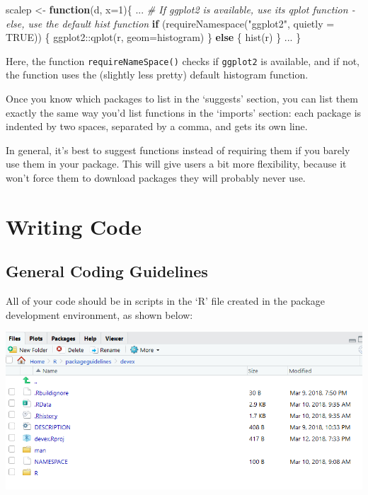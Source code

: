\documentclass[
]{book}
\newenvironment{Shaded}{\begin{snugshade}}{\end{snugshade}}
\newcommand{\AttributeTok}[1]{\textcolor[rgb]{0.77,0.63,0.00}{#1}}
\newcommand{\CommentTok}[1]{\textcolor[rgb]{0.56,0.35,0.01}{\textit{#1}}}
\newcommand{\ConstantTok}[1]{\textcolor[rgb]{0.00,0.00,0.00}{#1}}
\newcommand{\ControlFlowTok}[1]{\textcolor[rgb]{0.13,0.29,0.53}{\textbf{#1}}}
\newcommand{\DecValTok}[1]{\textcolor[rgb]{0.00,0.00,0.81}{#1}}
\newcommand{\FunctionTok}[1]{\textcolor[rgb]{0.00,0.00,0.00}{#1}}
\newcommand{\NormalTok}[1]{#1}
\newcommand{\OtherTok}[1]{\textcolor[rgb]{0.56,0.35,0.01}{#1}}
\newcommand{\SpecialCharTok}[1]{\textcolor[rgb]{0.00,0.00,0.00}{#1}}
\newcommand{\StringTok}[1]{\textcolor[rgb]{0.31,0.60,0.02}{#1}}
\begin{document}
\begin{Shaded}
\begin{Highlighting}[]
\NormalTok{scalep }\OtherTok{\textless{}{-}} \ControlFlowTok{function}\NormalTok{(d, }\AttributeTok{x=}\DecValTok{1}\NormalTok{)\{}
\NormalTok{  ...}
  \CommentTok{\# If ggplot2 is available, use its qplot function {-} else, use the default hist function}
  \ControlFlowTok{if}\NormalTok{ (}\FunctionTok{requireNamespace}\NormalTok{(}\StringTok{"ggplot2"}\NormalTok{, }\AttributeTok{quietly =} \ConstantTok{TRUE}\NormalTok{)) \{}
\NormalTok{    ggplot2}\SpecialCharTok{::}\FunctionTok{qplot}\NormalTok{(r, }\AttributeTok{geom=}\StringTok{\textquotesingle{}histogram\textquotesingle{}}\NormalTok{)}
\NormalTok{  \} }\ControlFlowTok{else}\NormalTok{ \{}
    \FunctionTok{hist}\NormalTok{(r)}
\NormalTok{  \}}
\NormalTok{  ...}
\NormalTok{\}}
\end{Highlighting}
\end{Shaded}

Here, the function \texttt{requireNameSpace()} checks if \texttt{ggplot2} is available, and if not, the function uses the (slightly less pretty) default histogram function.

Once you know which packages to list in the `suggests' section, you can list them exactly the same way you'd list functions in the `imports' section: each package is indented by two spaces, separated by a comma, and gets its own line.

In general, it's best to suggest functions instead of requiring them if you barely use them in your package. This will give users a bit more flexibility, because it won't force them to download packages they will probably never use.

\hypertarget{writing-code}{%
\section{Writing Code}\label{writing-code}}

\hypertarget{general-coding-guidelines}{%
\subsection{General Coding Guidelines}\label{general-coding-guidelines}}

All of your code should be in scripts in the `R' file created in the package development environment, as shown below:

\includegraphics{images/packageSS/code1.PNG}
\end{document}
